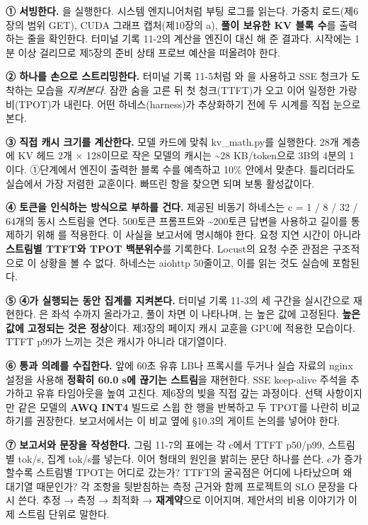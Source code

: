 \begin{tbbitemize}
  \item \textbf{① 서빙한다.} 을 실행한다. 시스템 엔지니어처럼 부팅 로그를 읽는다. 가중치 로드(제6장의 범위 GET), CUDA 그래프 캡처(제10장의 a), \textbf{풀이 보유한 KV 블록 수}를 출력하는 줄을 확인한다. 터미널 기록 11-2의 계산을 엔진이 대신 해 준 결과다. 시작에는 1분 이상 걸리므로 제5장의 준비 상태 프로브 예산을 떠올려야 한다.
  \item \textbf{② 하나를 손으로 스트리밍한다.} 터미널 기록 11-5처럼 와 을 사용하고 SSE 청크가 도착하는 모습을 \textit{지켜본다}. 잠깐 숨을 고른 뒤 첫 청크(TTFT)가 오고 이어 일정한 가랑비(TPOT)가 내린다. 어떤 하네스(harness)가 추상화하기 전에 두 시계를 직접 눈으로 본다.
  \item \textbf{③ 직접 캐시 크기를 계산한다.} 모델 카드에 맞춰 kv\_math.py를 실행한다. 28개 계층에 KV 헤드 2개 × 128이므로 작은 모델의 캐시는 \textasciitilde{}28 KB/token으로 3B의 4분의 1이다. ①단계에서 엔진이 출력한 블록 수를 예측하고 10\% 안에서 맞춘다. 틀리더라도 실습에서 가장 저렴한 교훈이다. 빠뜨린 항을 찾으면 되며 보통 활성값이다.
  \item \textbf{④ 토큰을 인식하는 방식으로 부하를 건다.} 제공된 비동기 하네스는 c = 1 / 8 / 32 / 64개의 동시 스트림을 연다. 500토큰 프롬프트와 \textasciitilde{}200토큰 답변을 사용하고 길이를 통제하기 위해 를 적용한다. 이 사실을 보고서에 명시해야 한다. 요청 지연 시간이 아니라 \textbf{스트림별 TTFT와 TPOT 백분위수}를 기록한다. Locust의 요청 수준 관점은 구조적으로 이 상황을 볼 수 없다. 하네스는 aiohttp 50줄이고, 이를 읽는 것도 실습에 포함된다.
  \item \textbf{⑤ ④가 실행되는 동안 집계를 지켜본다.} 터미널 기록 11-3의 세 구간을 실시간으로 재현한다. 은 좌석 수까지 올라가고, 풀이 차면 이 나타나며, 는 높은 값에 고정된다. \textbf{높은 값에 고정되는 것은 정상}이다. 제3장의 페이지 캐시 교훈을 GPU에 적용한 모습이다. TTFT p99가 느끼는 것은 캐시가 아니라 대기열이다.
  \item \textbf{⑥ 통과 의례를 수집한다.} 앞에 60초 유휴 LB나 프록시를 두거나 실습 자료의 nginx 설정을 사용해 \textbf{정확히 60.0 s에 끊기는 스트림}을 재현한다. SSE keep-alive 주석을 추가하고 유휴 타임아웃을 높여 고친다. 제6장의 빚을 직접 갚는 과정이다. 선택 사항이지만 같은 모델의 \textbf{AWQ INT4} 빌드로 스윕 한 행을 반복하고 두 TPOT를 나란히 비교하기를 권장한다. 보고서에서는 이 비교 옆에 §10.3의 게이트 논의를 넣어야 한다.
  \item \textbf{⑦ 보고서와 문장을 작성한다.} 그림 11-7의 표에는 각 c에서 TTFT p50/p99, 스트림별 tok/s, 집계 tok/s를 넣는다. 이어 형태의 원인을 밝히는 문단 하나를 쓴다. c가 증가할수록 스트림별 TPOT는 어디로 갔는가? TTFT의 굴곡점은 어디에 나타났으며 왜 대기열 때문인가? 각 조항을 뒷받침하는 측정 근거와 함께 프로젝트의 SLO 문장을 다시 쓴다. 추정 → 측정 → 최적화 → \textbf{재계약}으로 이어지며, 제안서의 비용 이야기가 이제 스트림 단위로 말한다.
\end{tbbitemize}

